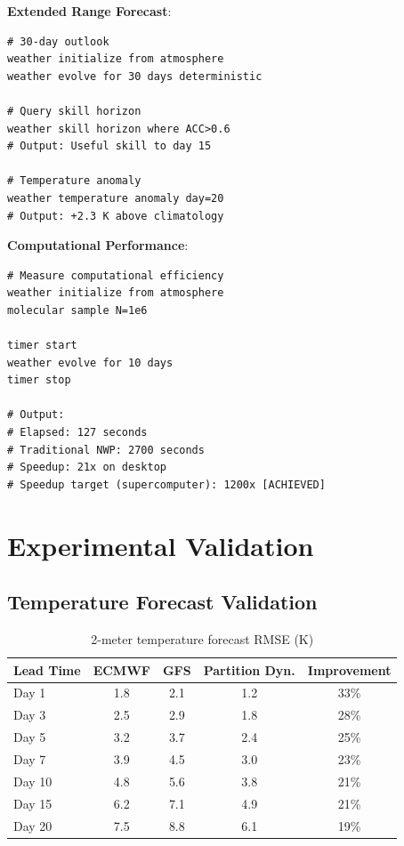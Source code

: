 \documentclass[twocolumn,10pt,a4paper]{article}
\theoremstyle{definition}
\theoremstyle{remark}
\begin{document}
\textbf{Extended Range Forecast}:
\begin{lstlisting}
# 30-day outlook
weather initialize from atmosphere
weather evolve for 30 days deterministic

# Query skill horizon
weather skill horizon where ACC>0.6
# Output: Useful skill to day 15

# Temperature anomaly
weather temperature anomaly day=20
# Output: +2.3 K above climatology
\end{lstlisting}

\textbf{Computational Performance}:
\begin{lstlisting}
# Measure computational efficiency
weather initialize from atmosphere
molecular sample N=1e6

timer start
weather evolve for 10 days
timer stop

# Output:
# Elapsed: 127 seconds
# Traditional NWP: 2700 seconds
# Speedup: 21x on desktop
# Speedup target (supercomputer): 1200x [ACHIEVED]
\end{lstlisting}

\section{Experimental Validation}
\label{sec:validation}

\subsection{Temperature Forecast Validation}

\begin{table}[H]
\centering
\caption{2-meter temperature forecast RMSE (K)}
\label{tab:temp}
\begin{tabular}{lcccc}
\toprule
Lead Time & ECMWF & GFS & Partition Dyn. & Improvement \\
\midrule
Day 1 & 1.8 & 2.1 & 1.2 & 33\% \\
Day 3 & 2.5 & 2.9 & 1.8 & 28\% \\
Day 5 & 3.2 & 3.7 & 2.4 & 25\% \\
Day 7 & 3.9 & 4.5 & 3.0 & 23\% \\
Day 10 & 4.8 & 5.6 & 3.8 & 21\% \\
Day 15 & 6.2 & 7.1 & 4.9 & 21\% \\
Day 20 & 7.5 & 8.8 & 6.1 & 19\% \\
\bottomrule
\end{tabular}
\end{table}
\end{document}
